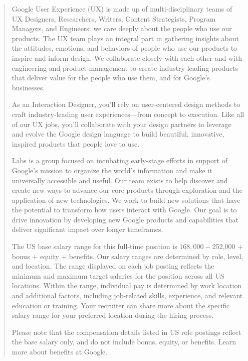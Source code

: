 \begin{quote}
    Google User Experience (UX) is made up of multi-disciplinary teams of UX Designers, Researchers, Writers, Content Strategists, Program Managers, and Engineers: we care deeply about the people who use our products. The UX team plays an integral part in gathering insights about the attitudes, emotions, and behaviors of people who use our products to inspire and inform design. We collaborate closely with each other and with engineering and product management to create industry-leading products that deliver value for the people who use them, and for Google’s businesses.
    
    As an Interaction Designer, you’ll rely on user-centered design methods to craft industry-leading user experiences—from concept to execution. Like all of our UX jobs, you’ll collaborate with your design partners to leverage and evolve the Google design language to build beautiful, innovative, inspired products that people love to use.
    
    Labs is a group focused on incubating early-stage efforts in support of Google’s mission to organize the world’s information and make it universally accessible and useful. Our team exists to help discover and create new ways to advance our core products through exploration and the application of new technologies. We work to build new solutions that have the potential to transform how users interact with Google. Our goal is to drive innovation by developing new Google products and capabilities that deliver significant impact over longer timeframes.
    
    The US base salary range for this full-time position is $168,000-$252,000 + bonus + equity + benefits. Our salary ranges are determined by role, level, and location. The range displayed on each job posting reflects the minimum and maximum target salaries for the position across all US locations. Within the range, individual pay is determined by work location and additional factors, including job-related skills, experience, and relevant education or training. Your recruiter can share more about the specific salary range for your preferred location during the hiring process.
    
    Please note that the compensation details listed in US role postings reflect the base salary only, and do not include bonus, equity, or benefits. Learn more about benefits at Google.
    

\end{quote}

